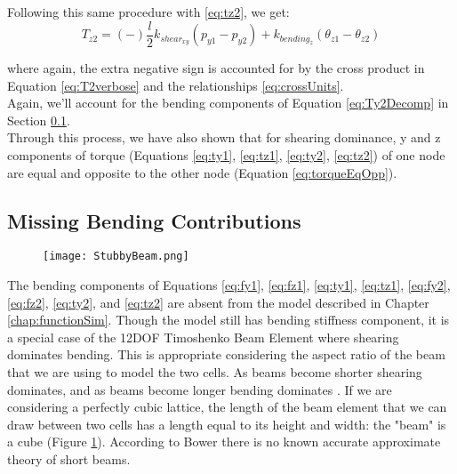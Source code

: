 {Following this same procedure with \ref{eq:tz2}, we get:
\[  T_{z2} =  (-)\dfrac{l}{2}k_{shear_{xy}}(p_{y1} - p_{y2}) + k_{bending_z}(\theta_{z1}  - \theta_{z2}) \]

where again, the extra negative sign is accounted for by the cross product in Equation \ref{eq:T2verbose} and the relationships \ref{eq:crossUnits}.\\

Again, we'll account for the bending components of Equation \ref{eq:Ty2Decomp} in Section \ref{sec:bendingdominance}.\\

Through this process, we have also shown that for shearing dominance, y and z components of torque (Equations \ref{eq:ty1}, \ref{eq:tz1}, \ref{eq:ty2}, \ref{eq:tz2}) of one node are equal and opposite to the other node (Equation \ref{eq:torqueEqOpp}).

\subsection{Missing Bending Contributions}\label{sec:bendingdominance}

\begin{figure}
  \texttt{[image: StubbyBeam.png]}
  \caption{}
  \label{fig:StubbyBeam}
\end{figure}

The bending components of Equations \ref{eq:fy1}, \ref{eq:fz1}, \ref{eq:ty1}, \ref{eq:tz1}, \ref{eq:fy2}, \ref{eq:fz2}, \ref{eq:ty2},  and \ref{eq:tz2} are absent from the model described in Chapter \ref{chap:functionSim}.  Though the model still has bending stiffness component, it is a special case of the 12DOF Timoshenko Beam Element where shearing dominates bending.  This is appropriate considering the aspect ratio of the beam that we are using to model the two cells.  As beams become shorter shearing dominates, and as beams become longer bending dominates \cite{Bower2009}.  If we are considering a perfectly cubic lattice, the length of the beam element that we can draw between two cells has a length equal to its height and width: the "beam" is a cube (Figure \ref{fig:StubbyBeam}).  According to Bower \cite{Bower2009} there is no known accurate approximate theory of short beams.

%


}
